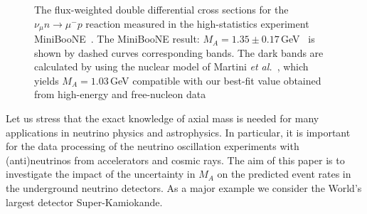 \begin{figure}[htb!]
\begin{center}
\caption{\label{MiniBooNE}The flux-weighted double differential cross sections for the $\nu_{\mu}n\to\mu^-p$ reaction measured in the high-statistics experiment MiniBooNE~\cite{AguilarArevalo:2010zc}. The MiniBooNE result: $M_{A}=1.35\pm0.17$\,GeV~\cite{AguilarArevalo:2010zc} is shown by dashed curves corresponding bands. The dark bands are calculated by using the nuclear model of Martini \textit{et al.}~\cite{Martini:2011wp}, which yields $M_{A}=1.03$\,GeV compatible with our best-fit value obtained from high-energy and free-nucleon data}
\end{center}
\end{figure}

Let us stress that the exact knowledge of axial mass is needed for many applications in neutrino physics and astrophysics. In particular, it is important for the data processing of the neutrino oscillation experiments with (anti)neutrinos from accelerators and cosmic rays. The aim of this paper is to investigate the impact of the uncertainty in $M_A$ on the predicted event rates in the underground neutrino detectors. As a major example we consider the World's largest detector Super-Kamiokande.
